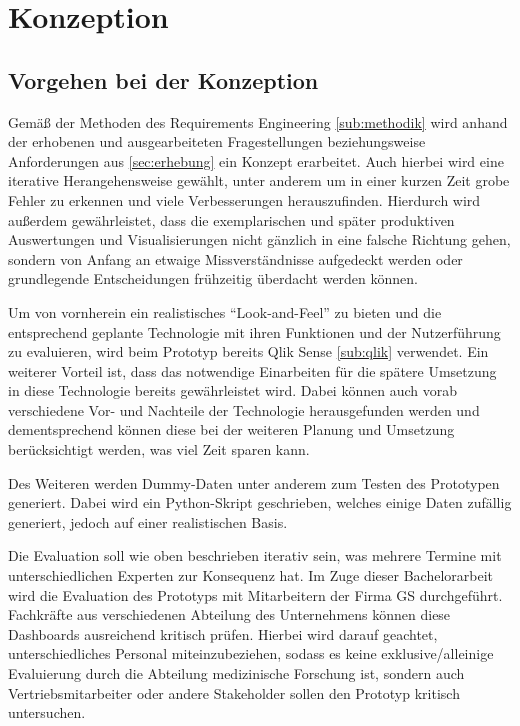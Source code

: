 \chapter{Konzeption}
\label{kap:konzept}

\minitoc\pagebreak

\section{Vorgehen bei der Konzeption}
\label{sec:vorgehenKonzept}

Gemäß der Methoden des Requirements Engineering \ref{sub:methodik} wird anhand der erhobenen und ausgearbeiteten Fragestellungen beziehungsweise Anforderungen aus \ref{sec:erhebung} ein Konzept erarbeitet. 
Auch hierbei wird eine iterative Herangehensweise gewählt, unter anderem um in einer kurzen Zeit grobe Fehler zu erkennen und viele Verbesserungen herauszufinden. 
Hierdurch wird außerdem gewährleistet, dass die exemplarischen und später produktiven Auswertungen und Visualisierungen nicht gänzlich in eine falsche Richtung gehen, sondern von Anfang an etwaige Missverständnisse aufgedeckt werden oder grundlegende Entscheidungen frühzeitig überdacht werden können.

Um von vornherein ein realistisches "`Look-and-Feel"' zu bieten und die entsprechend geplante Technologie mit ihren Funktionen und der Nutzerführung zu evaluieren, wird beim Prototyp bereits Qlik Sense \ref{sub:qlik} verwendet. 
Ein weiterer Vorteil ist, dass das notwendige Einarbeiten für die spätere Umsetzung in diese Technologie bereits gewährleistet wird. 
Dabei können auch vorab verschiedene Vor- und Nachteile der Technologie herausgefunden werden und dementsprechend können diese bei der weiteren Planung und Umsetzung berücksichtigt werden, was viel Zeit sparen kann.

Des Weiteren werden Dummy-Daten unter anderem zum Testen des Prototypen generiert. 
Dabei wird ein Python-Skript geschrieben, welches einige Daten zufällig generiert, jedoch auf einer realistischen Basis.

Die Evaluation soll wie oben beschrieben iterativ sein, was mehrere Termine mit unterschiedlichen Experten zur Konsequenz hat. 
Im Zuge dieser Bachelorarbeit wird die Evaluation des Prototyps mit Mitarbeitern der Firma \gls{GS} durchgeführt. 
Fachkräfte aus verschiedenen Abteilung des Unternehmens können diese Dashboards ausreichend kritisch prüfen.
Hierbei wird darauf geachtet, unterschiedliches Personal miteinzubeziehen, sodass es keine exklusive/alleinige Evaluierung durch die Abteilung medizinische Forschung ist, sondern auch Vertriebsmitarbeiter oder andere Stakeholder sollen den Prototyp kritisch untersuchen.

